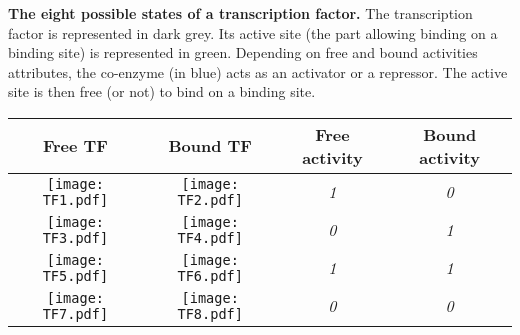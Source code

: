 
\begin{tablehere}
\begin{adjustwidth}{0in}{0in}
\centering
\caption[The eight possible states of a transcription factor.]{\textbf{The eight possible states of a transcription factor.} The transcription factor is represented in dark grey. Its active site (the part allowing binding on a binding site) is represented in green. Depending on free and bound activities attributes, the co-enzyme (in blue) acts as an activator or a repressor. The active site is then free (or not) to bind on a binding site.}
\begin{tabular}{ | c | c | c | c |}
\hline
\textbf{Free TF} & \textbf{Bound TF} & \textbf{Free activity} & \textbf{Bound activity}\\
\hline

\begin{minipage}{3cm}
\centering
\texttt{[image: TF1.pdf]}
\end{minipage}
& 
\begin{minipage}{3cm}
\centering
\texttt{[image: TF2.pdf]}
\end{minipage}
&
\textit{1}
&
\textit{0}
\\
\hline

\begin{minipage}{3cm}
\centering
\texttt{[image: TF3.pdf]}
\end{minipage}
& 
\begin{minipage}{3cm}
\centering
\texttt{[image: TF4.pdf]}
\end{minipage}
&
\textit{0}
&
\textit{1}
\\
\hline

\begin{minipage}{3cm}
\centering
\texttt{[image: TF5.pdf]}
\end{minipage}
& 
\begin{minipage}{3cm}
\centering
\texttt{[image: TF6.pdf]}
\end{minipage}
&
\textit{1}
&
\textit{1}
\\
\hline

\begin{minipage}{3cm}
\centering
\texttt{[image: TF7.pdf]}
\end{minipage}
& 
\begin{minipage}{3cm}
\centering
\texttt{[image: TF8.pdf]}
\end{minipage}
&
\textit{0}
&
\textit{0}
\\
\hline

\end{tabular}
\begin{flushleft}

\end{flushleft}
\label{table:part2:co_enzyme_activity}
\end{adjustwidth}
\end{tablehere}
